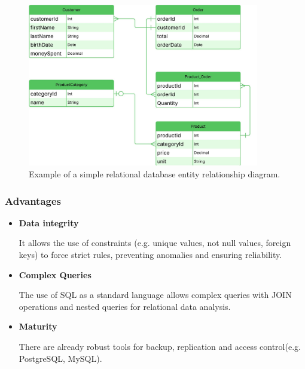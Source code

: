 \begin{figure}[H]
	\centering
	\includegraphics[width=0.9\textwidth, height=0.5\textheight, keepaspectratio]{Chapters/Figures/Databases/SQL.pdf}
	\caption{Example of a simple relational database entity relationship diagram. }
	\label{fig:databases:sql}
\end{figure}
\subsubsection{Advantages}

\begin{itemize}
	\item \textbf{Data integrity}

	      It allows the use of constraints (e.g. unique values, not null values,
	      foreign keys) to force strict rules, preventing anomalies and ensuring
	      reliability.

	\item \textbf{Complex Queries}

	      The use of \gls{SQL} as a standard language allows complex queries with JOIN
	      operations and nested queries for relational data analysis.

	\item \textbf{Maturity}

	      There are already robust tools for backup, replication and access
	      control(e.g. PostgreSQL, MySQL).

\end{itemize}

